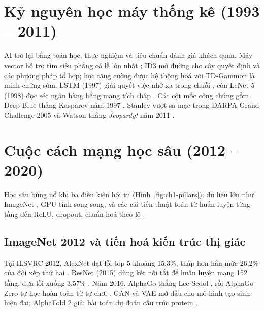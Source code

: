 
\section{Kỷ nguyên học máy thống kê (1993 -- 2011)}
AI trở lại bằng toán học, thực nghiệm và tiêu chuẩn đánh giá khách quan. Máy vector hỗ trợ tìm siêu phẳng có lề lớn nhất
\cite{ch1:cortes1995}; ID3 \cite{ch1:quinlan1986} mở đường cho cây quyết định và các phương pháp tổ hợp; học tăng cường được hệ thống
hoá \cite{ch1:sutton2018} với TD-Gammon \cite{ch1:tesauro1995} là minh chứng sớm. LSTM (1997) giải quyết việc nhớ xa trong chuỗi
\cite{ch1:hochreiter1997}, còn LeNet-5 (1998) đọc séc ngân hàng bằng mạng tích chập \cite{ch1:lecun1998}. Các cột mốc công chúng gồm Deep
Blue thắng Kasparov năm 1997 \cite{ch1:campbell2002}, Stanley vượt sa mạc trong DARPA Grand Challenge 2005 \cite{ch1:thrun2006} và Watson
thắng \emph{Jeopardy!} năm 2011 \cite{ch1:ferrucci2010}.

\section{Cuộc cách mạng học sâu (2012 -- 2020)}
Học sâu bùng nổ khi ba điều kiện hội tụ (Hình~\ref{fig:ch1-pillars}): dữ liệu lớn như ImageNet \cite{ch1:deng2009}, GPU tính song song, và
các cải tiến thuật toán từ huấn luyện từng tầng \cite{ch1:hinton2006} đến ReLU, dropout, chuẩn hoá theo lô \cite{ch1:lecun2015,ch1:goodfellow2016}.


\subsection{ImageNet 2012 và tiến hoá kiến trúc thị giác}
Tại ILSVRC 2012, AlexNet đạt lỗi top-5 khoảng 15,3\%, thấp hơn hẳn mức 26,2\% của đội xếp thứ hai \cite{ch1:krizhevsky2012,ch1:russakovsky2015}.
ResNet (2015) dùng kết nối tắt để huấn luyện mạng 152 tầng, đưa lỗi xuống 3,57\% \cite{ch1:he2016}. Năm 2016, AlphaGo thắng Lee Sedol
\cite{ch1:silver2016}, rồi AlphaGo Zero tự học hoàn toàn từ tự chơi \cite{ch1:silver2017}. GAN \cite{ch1:goodfellow2014} và VAE
\cite{ch1:kingma2014} mở đầu cho mô hình tạo sinh hiện đại; AlphaFold 2 giải bài toán dự đoán cấu trúc protein \cite{ch1:jumper2021}.

